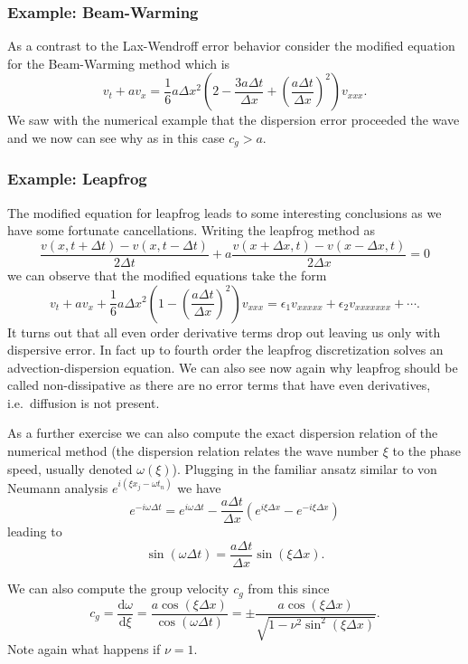 \documentclass[11pt]{article}
\begin{document}
    \hypertarget{example-beam-warming}{%
\subsubsection{Example: Beam-Warming}\label{example-beam-warming}}

As a contrast to the Lax-Wendroff error behavior consider the modified
equation for the Beam-Warming method which is \[
    v_t + a v_x = \frac{1}{6} a \Delta x^2 \left ( 2- \frac{3 a \Delta t}{\Delta x} + \left(\frac{a \Delta t}{\Delta x} \right)^2 \right ) v_{xxx}.
\] We saw with the numerical example that the dispersion error proceeded
the wave and we now can see why as in this case \(c_g > a\).

    \hypertarget{example-leapfrog}{%
\subsubsection{Example: Leapfrog}\label{example-leapfrog}}

The modified equation for leapfrog leads to some interesting conclusions
as we have some fortunate cancellations. Writing the leapfrog method as
\[
    \frac{v(x, t + \Delta t) - v(x, t - \Delta t)}{2 \Delta t} + a \frac{v(x + \Delta x, t) - v(x - \Delta x, t)}{2 \Delta x} = 0
\] we can observe that the modified equations take the form \[
    v_t + a v_x + \frac{1}{6} a \Delta x^2 \left(1 - \left( \frac{a \Delta t}{\Delta x} \right )^2 \right) v_{xxx} = \epsilon_1 v_{xxxxx} + \epsilon_2 v_{xxxxxxx} + \cdots.
\] It turns out that all even order derivative terms drop out leaving us
only with dispersive error. In fact up to fourth order the leapfrog
discretization solves an advection-dispersion equation. We can also see
now again why leapfrog should be called non-dissipative as there are no
error terms that have even derivatives, i.e.~diffusion is not present.

    As a further exercise we can also compute the exact dispersion relation
of the numerical method (the dispersion relation relates the wave number
\(\xi\) to the phase speed, usually denoted \(\omega(\xi)\)). Plugging
in the familiar ansatz similar to von Neumann analysis
\(e^{i(\xi x_j - \omega t_n)}\) we have \[
    e^{-i\omega \Delta t} = e^{i \omega \Delta t} - \frac{a \Delta t}{\Delta x} \left( e^{i \xi \Delta x} - e^{-i\xi \Delta x}\right)
\] leading to \[
    \sin(\omega \Delta t) = \frac{a \Delta t}{\Delta x} \sin(\xi \Delta x).
\]

    We can also compute the group velocity \(c_g\) from this since \[
    c_g = \frac{\text{d} \omega}{\text{d} \xi} = \frac{a \cos(\xi \Delta x)}{\cos(\omega \Delta t)} = \pm \frac{a \cos(\xi \Delta x)}{\sqrt{1 - \nu^2 \sin^2(\xi \Delta x)}}.
\] Note again what happens if \(\nu = 1\).
\end{document}
